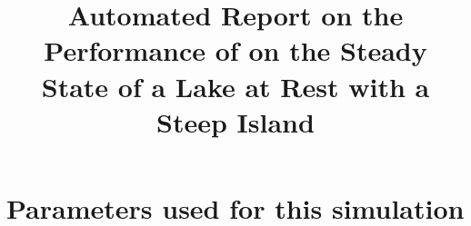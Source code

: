 \documentclass[11pt,a4paper]{article}%
\begin{document}
 

\title{Automated Report on the Performance of \anuga{} on the Steady State of a Lake at Rest with a Steep Island}
\maketitle




\section{Parameters used for this simulation}






\end{document}
